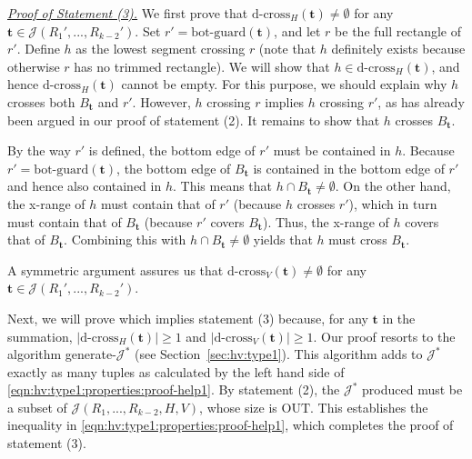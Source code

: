 \documentclass[sigconf]{acmart}
\def\vgap{\vspace{0mm}}
\def\J{\mathcal{J}}
\def\gbot{\mathrm{bot\text{-}guard}}
\def\dcross{\mathrm{d\text{-}cross}}
\def\out{\mathrm{OUT}}
\begin{document}
{{{\vgap 

\noindent \underline{\em Proof of Statement (3).} We first prove that $\dcross_H(\bm{t}) \neq \emptyset$ for any $\bm{t} \in \J(R_1',...,R_{k-2}')$. Set $r' = \gbot(\bm{t})$, and let $r$ be the full rectangle of $r'$. Define $h$ as the lowest segment crossing $r$ (note that $h$ definitely exists because otherwise $r$ has no trimmed rectangle). We will show that $h \in \dcross_H(\bm{t})$, and hence $\dcross_H(\bm{t})$ cannot be empty. For this purpose, we should explain why $h$ crosses both $B_{\bm{t}}$ and $r'$. However, $h$ crossing $r$ implies $h$ crossing $r'$, as has already been argued in our proof of statement (2). It remains to show that $h$ crosses $B_\bm{t}$.

\vgap

By the way $r'$ is defined, the bottom edge of $r'$ must be contained in $h$. Because $r' = \gbot(\bm{t})$, the bottom edge of $B_\bm{t}$ is contained in the bottom edge of $r'$ and hence also contained in $h$. This means that $h \cap B_{\bm{t}}\neq \emptyset$. On the other hand, the x-range of $h$ must contain that of $r'$ (because $h$ crosses $r'$), which in turn must contain that of $B_\bm{t}$ (because $r'$ covers $B_\bm{t}$). Thus, the x-range of $h$ covers that of $B_\bm{t}$. Combining this with $h \cap B_{\bm{t}}\neq \emptyset$ yields that $h$ must cross $B_\bm{t}$.

\vgap 

A symmetric argument assures us that $\dcross_V(\bm{t}) \ne \emptyset$ for any $\bm{t} \in \J(R_1',...,R_{k-2}')$. 


\vgap 

Next, we will prove 
\myeqn{
    \sum_{\bm{t}\in \J(R_1',...,R_{k-2}')} |\dcross_H(\bm{t})| \cdot |\dcross_V(\bm{t})| \leq \out. \label{eqn:hv:type1:properties:proof-help1}
} 
which implies statement (3) because, for any $\bm{t}$ in the summation, $|\dcross_H(\bm{t})| \ge 1$ and $|\dcross_V(\bm{t})| \ge 1$. Our proof resorts to the algorithm generate-$\J^*$ (see Section~\ref{sec:hv:type1}). This algorithm adds to $\J^*$ exactly as many tuples as calculated by the left hand side of \eqref{eqn:hv:type1:properties:proof-help1}. By statement (2), the $\J^*$ produced must be a subset of $\J(R_1,...,R_{k-2},H,V)$, whose size is $\out$. This establishes the inequality in \eqref{eqn:hv:type1:properties:proof-help1}, which completes the proof of statement (3).




}}}
\end{document}
